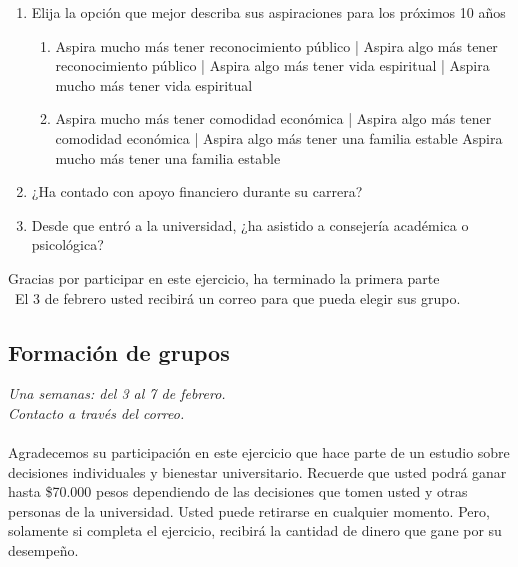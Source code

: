 \begin{enumerate}
\begin{enumerate}
\end{enumerate}
\item Elija la opción que mejor describa sus aspiraciones para los próximos 10 años
\begin{enumerate}
    \item Aspira mucho más tener reconocimiento público | Aspira algo más tener reconocimiento público | Aspira algo más tener vida espiritual |  Aspira mucho más tener vida espiritual
    \item Aspira mucho más tener comodidad económica | Aspira algo más tener comodidad económica | Aspira algo más tener una familia estable	Aspira mucho más tener una familia estable
\end{enumerate}
\item ¿Ha contado con apoyo financiero durante su carrera?
\item Desde que entró a la universidad, ¿ha asistido a consejería académica o psicológica?
\end{enumerate}
Gracias por participar en este ejercicio, ha terminado la primera parte\\\
El 3 de febrero usted recibirá un correo para que pueda elegir sus grupo.


\subsection{Formación de grupos}
\textit{Una semanas: del 3 al 7 de febrero.\\
Contacto a través del correo. \\}
\vspace*{0.5cm}\\ 
Agradecemos su participación en este ejercicio que hace parte de un estudio sobre decisiones individuales y bienestar universitario. Recuerde que usted podrá ganar hasta \$70.000 pesos dependiendo de las decisiones que tomen usted y otras personas de la universidad. Usted puede retirarse en cualquier momento. Pero, solamente si completa el ejercicio, recibirá la cantidad de dinero que gane por su desempeño.\\

